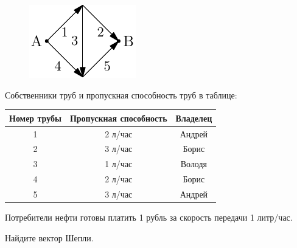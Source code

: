 



\begin{figure}[htbp]
	\includegraphics{coop_nefteprovod.pdf}
\end{figure}

Собственники труб и пропускная способность труб в таблице:

\begin{tabular}{|c|c|c|}

\hline 
Номер трубы & Пропускная способность & Владелец \\
\hline
1 & 2 л/час & Андрей \\
2 & 3 л/час & Борис \\
3 & 1 л/час & Володя \\
4 & 2 л/час & Борис \\
5 & 3 л/час & Андрей \\
\hline
\end{tabular}

Потребители нефти готовы платить 1 рубль за скорость передачи 1 литр/час. 

Найдите вектор Шепли.

